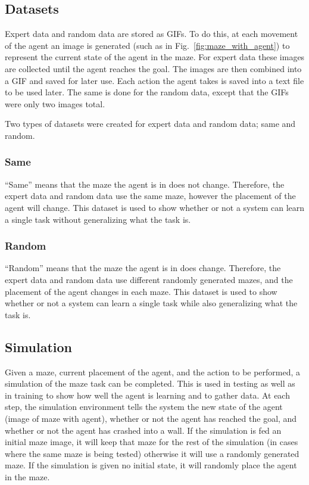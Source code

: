 \documentclass[12pt,american]{report}
\begin{document}
\subsection{Datasets}
Expert data and random data are stored as GIFs.  To do this, at each movement of the agent an image is generated (such as in Fig.~\ref{fig:maze_with_agent}) to represent the current state of the agent in the maze.  For expert data these images are collected until the agent reaches the goal. The images are then combined into a GIF and saved for later use.  Each action the agent takes is saved into a text file to be used later. The same is done for the random data, except that the GIFs were only two images total.

Two types of datasets were created for expert data and random data; same and random.
\subsubsection{Same}
``Same'' means that the maze the agent is in does not change.  Therefore, the expert data and random data use the same maze, however the placement of the agent will change.  This dataset is used to show whether or not a system can learn a single task without generalizing what the task is.

\subsubsection{Random}
``Random'' means that the maze the agent is in does change.  Therefore, the expert data and random data use different randomly generated mazes, and the placement of the agent changes in each maze.  This dataset is used to show whether or not a system can learn a single task while also generalizing what the task is.

\subsection{Simulation}
Given a maze, current placement of the agent, and the action to be performed, a simulation of the maze task can be completed.  This is used in testing as well as in training to show how well the agent is learning and to gather data.  At each step, the simulation environment tells the system the new state of the agent (image of maze with agent), whether or not the agent has reached the goal, and whether or not the agent has crashed into a wall.  If the simulation is fed an initial maze image, it will keep that maze for the rest of the simulation (in cases where the same maze is being tested) otherwise it will use a randomly generated maze.  If the simulation is given no initial state, it will randomly place the agent in the maze.
\end{document}
